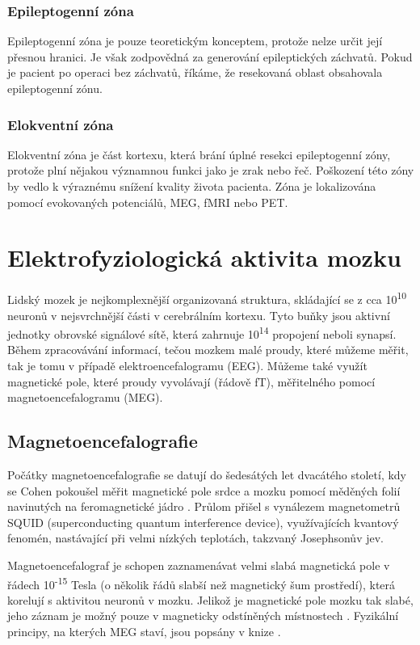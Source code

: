 \subsubsection{Epileptogenní zóna}
Epileptogenní zóna je pouze teoretickým konceptem, protože nelze určit její přesnou hranici. Je však zodpovědná za generování epileptických záchvatů. Pokud je pacient po operaci bez záchvatů, říkáme, že resekovaná oblast obsahovala epileptogenní zónu. \cite{4}

\subsubsection{Elokventní zóna}
Elokventní zóna je část kortexu, která brání úplné resekci epileptogenní zóny, protože plní nějakou významnou funkci jako je zrak nebo řeč. Poškození této zóny by vedlo k výraznému snížení kvality života pacienta. Zóna je lokalizována pomocí evokovaných potenciálů, MEG, fMRI nebo PET. \cite{4}




\section{Elektrofyziologická aktivita mozku}
Lidský mozek je nejkomplexnější organizovaná struktura, skládající se z cca 10\textsuperscript{10} neuronů v nejsvrchnější části v cerebrálním kortexu. Tyto buňky jsou aktivní jednotky obrovské signálové sítě, která zahrnuje 10\textsuperscript{14} propojení neboli synapsí. Během zpracovávání informací, tečou mozkem malé proudy, které můžeme měřit, tak je tomu v případě elektroencefalogramu (EEG). Můžeme také využít magnetické pole, které proudy vyvolávají (řádově fT), měřitelného pomocí magnetoencefalogramu (MEG). \cite{5}

\subsection{Magnetoencefalografie}
Počátky magnetoencefalografie se datují do šedesátých let dvacátého století, kdy se Cohen pokoušel měřit magnetické pole srdce a mozku pomocí měděných folií navinutých na feromagnetické jádro \cite{7}. Průlom přišel s vynálezem magnetometrů SQUID (superconducting quantum interference device), využívajících kvantový fenomén, nastávající při velmi nízkých teplotách, takzvaný Josephsonův jev. \cite{8}

Magnetoencefalograf je schopen zaznamenávat velmi slabá magnetická pole v řádech 10\textsuperscript{-15} Tesla (o několik řádů slabší než magnetický šum prostředí), která korelují s aktivitou neuronů v mozku. Jelikož je magnetické pole mozku tak slabé, jeho záznam je možný pouze v magneticky odstíněných místnostech \cite{6}. Fyzikální principy, na kterých MEG staví, jsou popsány v knize \cite{9}. 

